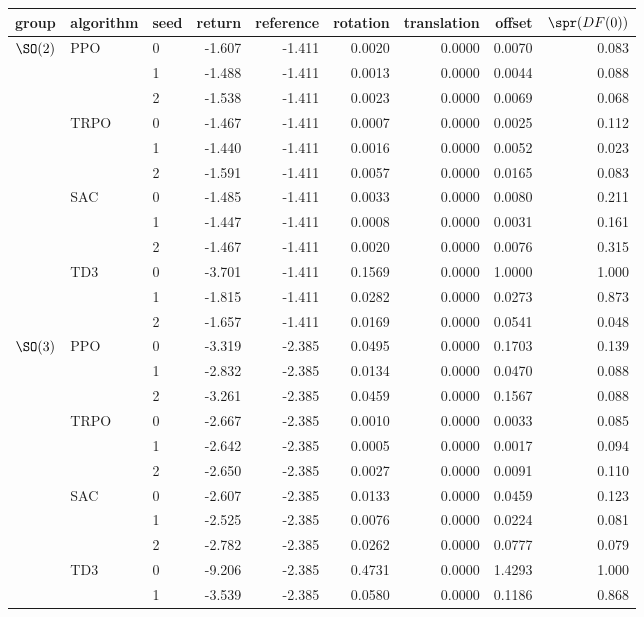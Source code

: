 \begin{tabular}{lllrrrrrr}
\toprule
group & algorithm & seed & return & reference & rotation & translation & offset & $\spr(DF(0))$ \\
\midrule
$\SO(2)$ & PPO & 0 & -1.607 & -1.411 & 0.0020 & 0.0000 & 0.0070 & 0.083 \\
 &  & 1 & -1.488 & -1.411 & 0.0013 & 0.0000 & 0.0044 & 0.088 \\
 &  & 2 & -1.538 & -1.411 & 0.0023 & 0.0000 & 0.0069 & 0.068 \\
 & TRPO & 0 & -1.467 & -1.411 & 0.0007 & 0.0000 & 0.0025 & 0.112 \\
 &  & 1 & -1.440 & -1.411 & 0.0016 & 0.0000 & 0.0052 & 0.023 \\
 &  & 2 & -1.591 & -1.411 & 0.0057 & 0.0000 & 0.0165 & 0.083 \\
 & SAC & 0 & -1.485 & -1.411 & 0.0033 & 0.0000 & 0.0080 & 0.211 \\
 &  & 1 & -1.447 & -1.411 & 0.0008 & 0.0000 & 0.0031 & 0.161 \\
 &  & 2 & -1.467 & -1.411 & 0.0020 & 0.0000 & 0.0076 & 0.315 \\
 & TD3 & 0 & -3.701 & -1.411 & 0.1569 & 0.0000 & 1.0000 & 1.000 \\
 &  & 1 & -1.815 & -1.411 & 0.0282 & 0.0000 & 0.0273 & 0.873 \\
 &  & 2 & -1.657 & -1.411 & 0.0169 & 0.0000 & 0.0541 & 0.048 \\
\midrule
$\SO(3)$ & PPO & 0 & -3.319 & -2.385 & 0.0495 & 0.0000 & 0.1703 & 0.139 \\
 &  & 1 & -2.832 & -2.385 & 0.0134 & 0.0000 & 0.0470 & 0.088 \\
 &  & 2 & -3.261 & -2.385 & 0.0459 & 0.0000 & 0.1567 & 0.088 \\
 & TRPO & 0 & -2.667 & -2.385 & 0.0010 & 0.0000 & 0.0033 & 0.085 \\
 &  & 1 & -2.642 & -2.385 & 0.0005 & 0.0000 & 0.0017 & 0.094 \\
 &  & 2 & -2.650 & -2.385 & 0.0027 & 0.0000 & 0.0091 & 0.110 \\
 & SAC & 0 & -2.607 & -2.385 & 0.0133 & 0.0000 & 0.0459 & 0.123 \\
 &  & 1 & -2.525 & -2.385 & 0.0076 & 0.0000 & 0.0224 & 0.081 \\
 &  & 2 & -2.782 & -2.385 & 0.0262 & 0.0000 & 0.0777 & 0.079 \\
 & TD3 & 0 & -9.206 & -2.385 & 0.4731 & 0.0000 & 1.4293 & 1.000 \\
 &  & 1 & -3.539 & -2.385 & 0.0580 & 0.0000 & 0.1186 & 0.868 \\

\end{tabular}
